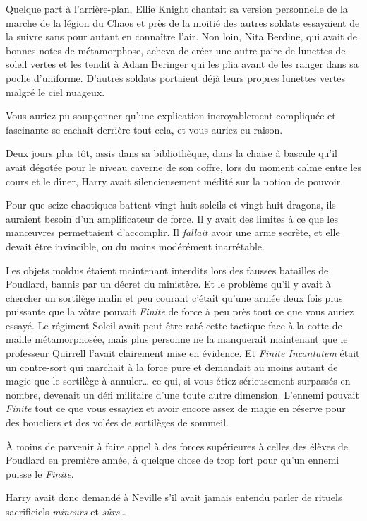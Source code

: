 Quelque part à l'arrière-plan, Ellie Knight chantait sa version personnelle de la marche de la légion du Chaos et près de la moitié des autres soldats essayaient de la suivre sans pour autant en connaître l'air.
Non loin, Nita Berdine, qui avait de bonnes notes de métamorphose, acheva de créer une autre paire de lunettes de soleil vertes et les tendit à Adam Beringer qui les plia avant de les ranger dans sa poche d'uniforme.
D'autres soldats portaient déjà leurs propres lunettes vertes malgré le ciel nuageux.

Vous auriez pu soupçonner qu'une explication incroyablement compliquée et fascinante se cachait derrière tout cela, et vous auriez eu raison.

Deux jours plus tôt, assis dans sa bibliothèque, dans la chaise à bascule qu'il avait dégotée pour le niveau caverne de son coffre, lors du moment calme entre les cours et le dîner, Harry avait silencieusement médité sur la notion de pouvoir.

Pour que seize chaotiques battent vingt-huit soleils et vingt-huit dragons, ils auraient besoin d'un amplificateur de force.
Il y avait des limites à ce que les manœuvres permettaient d'accomplir.
Il \emph{fallait} avoir une arme secrète, et elle devait être invincible, ou du moins modérément inarrêtable.

Les objets moldus étaient maintenant interdits lors des fausses batailles de Poudlard, bannis par un décret du ministère.
Et le problème qu'il y avait à chercher un sortilège malin et peu courant c'était qu'une armée deux fois plus puissante que la vôtre pouvait \emph{Finite} de force à peu près tout ce que vous auriez essayé.
Le régiment Soleil avait peut-être raté cette tactique face à la cotte de maille métamorphosée, mais plus personne ne la manquerait maintenant que le professeur Quirrell l'avait clairement mise en évidence.
Et \emph{Finite Incantatem} était un contre-sort qui marchait à la force pure et demandait au moins autant de magie que le sortilège à annuler… ce qui, si vous étiez sérieusement surpassés en nombre, devenait un défi militaire d'une toute autre dimension.
L'ennemi pouvait \emph{Finite} tout ce que vous essayiez et avoir encore assez de magie en réserve pour des boucliers et des volées de sortilèges de sommeil.

À moins de parvenir à faire appel à des forces supérieures à celles des élèves de Poudlard en première année, à quelque chose de trop fort pour qu'un ennemi puisse le \emph{Finite}.

Harry avait donc demandé à Neville s'il avait jamais entendu parler de rituels sacrificiels \emph{mineurs} et \emph{sûrs}…

